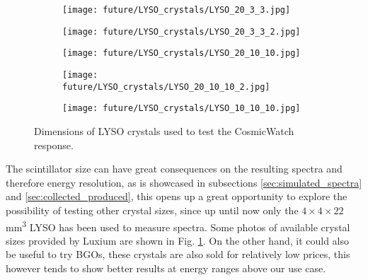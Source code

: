 \begin{figure}[H]
    \begin{subfigure}[t]{0.49\textwidth}
        \centering
        \texttt{[image: future/LYSO\_crystals/LYSO\_20\_3\_3.jpg]}
    \end{subfigure}
    \begin{subfigure}[t]{0.49\textwidth}
        \centering
        \texttt{[image: future/LYSO\_crystals/LYSO\_20\_3\_3\_2.jpg]}
    \end{subfigure}
    \medskip
    \begin{subfigure}[t]{0.49\textwidth}
        \centering
        \texttt{[image: future/LYSO\_crystals/LYSO\_20\_10\_10.jpg]}
    \end{subfigure}
    \begin{subfigure}[t]{0.49\textwidth}
        \centering
        \texttt{[image: future/LYSO\_crystals/LYSO\_20\_10\_10\_2.jpg]}
    \end{subfigure}
    \medskip
    \begin{subfigure}[t]{\textwidth}
        \centering
        \texttt{[image: future/LYSO\_crystals/LYSO\_10\_10\_10.jpg]}
    \end{subfigure}
    \caption{\label{fig:LYSO_crystals}Dimensions of LYSO crystals used to test the CosmicWatch response.}
\end{figure}

The scintillator size can have great consequences on the resulting spectra and therefore energy resolution, as is showcased in subsections \ref{sec:simulated_spectra} and \ref{sec:collected_produced}, this opens up a great opportunity to explore the possibility of testing other crystal sizes, since up until now only the $4\times4\times22$ \unit{\mm\cubed} LYSO has been used to measure spectra. Some photos of available crystal sizes provided by Luxium are shown in Fig. \ref{fig:LYSO_crystals}. On the other hand, it could also be useful to try BGOs, these crystals are also sold for relatively low prices, this however tends to show better results at energy ranges above our use case.